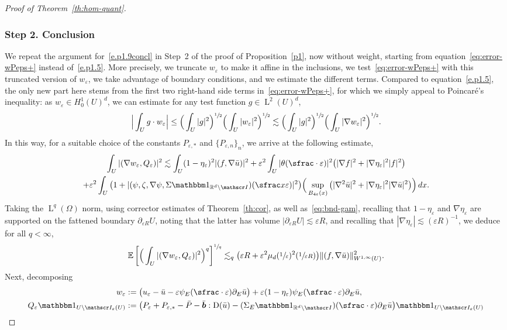 \documentclass[JEP,XML,SOM,Unicode,published]{cedram}
\let\mathcal\mathscr
\newcommand{\Psfrac}[2]{(\sfrac{#1}{#2})}
\let\mathds\mathbbm
\theoremstyle{plain}
\theoremstyle{definition}
\newcommand{\e}{\varepsilon}
\newcommand{\R}{\mathbb R}
\newcommand{\Ic}{\mathcal I}
\newcommand{\D}{\operatorname{D}}
\newcommand{\bb}{\bar{\boldsymbol b}}
\newcommand{\Ld}{\operatorname{L}}
\newcommand{\step}[1]{\subsubsection*{Step #1}}
\newcommand{\expec}[1]{\mathbb{E}\left[ #1 \right]}
\begin{document}
\begin{proof}[Proof of Theorem~\ref{th:hom-quant}]
\step{2. Conclusion}
We repeat the argument for~\eqref{e.p1.9concl} in Step~2 of the proof of Proposition~\ref{p1}, now without weight, starting from equation~\eqref{eq:error-wPeps+} instead of~\eqref{e.p1.5}. More precisely, we truncate $w_\e$ to make it affine in the inclusions, we test~\eqref{eq:error-wPeps+} with this truncated version of $w_\e$, we take advantage of boundary conditions, and we estimate the different terms.
Compared to equation~\eqref{e.p1.5}, the only new part here stems from the first two right-hand side terms in~\eqref{eq:error-wPeps+}, for which we simply appeal to Poincaré's inequality: as $w_\e\in H^1_0(U)^d$, we can estimate for any test function $g\in \Ld^2(U)^d$,
\[\Big|\int_Ug\cdot w_\e\Big|\le \Big(\int_U|g|^2\Big)^{\sfrac12}\Big(\int_U|w_\e|^2\Big)^{\sfrac12}\lesssim \Big(\int_U|g|^2\Big)^{\sfrac12}\Big(\int_U|\nabla w_\e|^2\Big)^{\sfrac12}.\]
In this way, for a suitable choice of the constants $P_{\e,*}$ and $\{P_{\e,n}\}_n$, we arrive at the following estimate,
\begin{multline}\label{eq:bnd-weps-Qeps-pre}
\int_{U}|(\nabla w_\e,Q_\e)|^2
\lesssim \int_{U}(1-\eta_\e)^2|(f,\nabla\bar u)|^2
+\e^2\int_U|\theta(\sfrac\cdot\e)|^2\big(|\nabla f|^2+|\nabla\eta_\e|^2|f|^2\big)\\
+\e^2\int_U\big(1+|(\psi,\zeta,\nabla\psi,\Sigma\mathds1_{\R^d\setminus\Ic})(\sfrac x\e)|^2\big)\Big(\sup_{B_{4\e}(x)}\big(|\nabla^2\bar u|^2+|\nabla\eta_\e|^2|\nabla\bar u|^2\big)\Big)\,dx.
\end{multline}
Taking the $\Ld^q(\Omega)$ norm, using corrector estimates of Theorem~\ref{th:cor}, as well as~\eqref{eq:bnd-gam},
recalling that $1-\eta_\e$ and $\nabla\eta_\e$ are supported on the fattened boundary $\partial_{\e R}U$, noting that the latter has volume $|\partial_{\e R}U|\lesssim \e R$, and recalling that \mbox{$|\nabla\eta_\e|\lesssim(\e R)^{-1}$},
we deduce for all $q<\infty$,
\begin{equation}\label{eq:bnd-weps-Qeps-pre-re}
\expec{\Big(\int_{U}|(\nabla w_\e,Q_\e)|^2\Big)^q}^{\sfrac1q}
\lesssim_q 
\big(\e R+\e^2 \mu_d(\sfrac1\e)^2\Psfrac1{\e R}\big)\|(f,\nabla\bar u)\|_{W^{1,\infty}(U)}^2.
\end{equation}
Next, decomposing
\begin{align*}
w_\e&:= \big(u_\e-\bar u-\e\psi_E(\sfrac\cdot\e)\partial_E\bar u\big)+\e(1-\eta_\e)\psi_E(\sfrac\cdot\e)\partial_E\bar u,\\
Q_\e\mathds1_{U\setminus\Ic_\e(U)}&:= \big(P_\e+P_{\e,*}-\bar P-\bb:\D(\bar u)-(\Sigma_E\mathds1_{\R^d\setminus\Ic})(\sfrac\cdot\e)\partial_E\bar u\big)\mathds1_{U\setminus\Ic_\e(U)}\\

\end{align*}
\end{proof}
\end{document}
